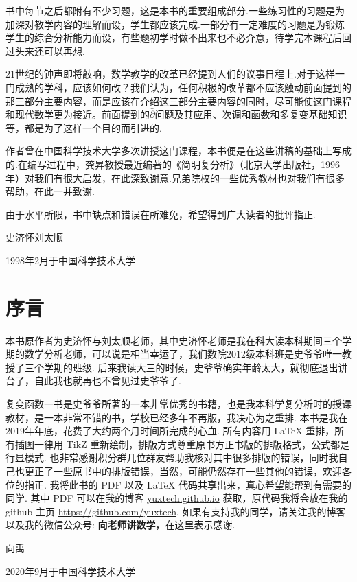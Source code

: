 书中每节之后都附有不少习题，这是本书的重要组成部分.一些练习性的习题是为加深对教学内容的理解而设，学生都应该完成.一部分有一定难度的习题是为锻炼学生的综合分析能力而设，有些题初学时做不出来也不必介意，待学完本课程后回过头来还可以再想.

21世纪的钟声即将敲响，数学教学的改革已经提到人们的议事日程上.对于这样一门成熟的学科，应该如何改？我们认为，任何积极的改革都不应该触动前面提到的那三部分主要内容，而是应该在介绍这三部分主要内容的同时，尽可能使这门课程和现代数学更为接近。前面提到的$\bar\partial$问题及其应用、次调和函数和多复变基础知识等，都是为了这样一个目的而引进的.

作者曾在中国科学技术大学多次讲授这门课程，本书便是在这些讲稿的基础上写成的.在编写过程中，龚昇教授最近编著的《简明复分析》（北京大学出版社，1996年）对我们有很大启发，在此深致谢意.兄弟院校的一些优秀教材也对我们有很多帮助，在此一并致谢.

由于水平所限，书中缺点和错误在所难免，希望得到广大读者的批评指正.

\vspace*{1cm}
\hfill {\kaishu 史济怀\qquad 刘太顺}\hspace*{1.2cm}

\hfill 1998年2月于中国科学技术大学

\newpage
\chapter*{序\qquad 言}
本书原作者为史济怀与刘太顺老师，其中史济怀老师是我在科大读本科期间三个学期的数学分析老师，可以说是相当幸运了，我们数院2012级本科班是史爷爷唯一教授了三个学期的班级. 后来我读大三的时候，史爷爷确实年龄太大，就彻底退出讲台了，自此我也就再也不曾见过史爷爷了.

复变函数一书是史爷爷所著的一本非常优秀的书籍，也是我本科学复分析时的授课教材，是一本非常不错的书，学校已经多年不再版，我决心为之重排. 本书是我在2019年年底，花费了大约两个月时间所完成的心血. 所有内容用 \LaTeX{} 重排，所有插图一律用 TikZ 重新绘制，排版方式尊重原书方正书版的排版格式，公式都是行显模式. 也非常感谢积分群几位群友帮助我核对其中很多排版的错误，同时我自己也更正了一些原书中的排版错误，当然，可能仍然存在一些其他的错误，欢迎各位的指正. 我将此书的 PDF 以及 \LaTeX{} 代码共享出来，真心希望能帮到有需要的同学. 其中 PDF 可以在我的博客 \href{yuxtech.github.io}{yuxtech.github.io} 获取，原代码我将会放在我的 github 主页 \href{https://github.com/yuxtech}{https://github.com/yuxtech}. 如果有支持我的同学，请关注我的博客以及我的微信公众号: \textbf{向老师讲数学}，在这里表示感谢.

\hfill {\kaishu 向禹}\hspace*{2.8cm}

\hfill 2020年9月于中国科学技术大学
\clearpage
